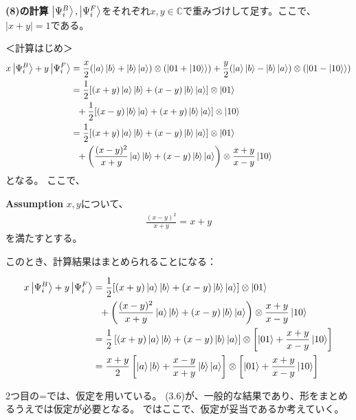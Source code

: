 \documentclass[a4paper,11pt]{jsarticle}
\numberwithin{equation}{section}
\begin{document}
\begin{itembox}[l]{\textbf{(8)の計算 }}
$\ket{\Psi_i^B},\ket{\Psi_i^F}$をそれぞれ$x,y \in \mathbb{C}$で重みづけして足す。ここで、$|x+y|=1$である。
\end{itembox}
＜計算はじめ＞
\begin{align}
x\ket{\Psi_i^B}+y\ket{\Psi_i^F} &= \frac{x}{2}(\ket{a}\ket{b}+\ket{b}\ket{a})\otimes (\ket{01+\ket{10}})+\frac{y}{2}(\ket{a}\ket{b}-\ket{b}\ket{a})\otimes (\ket{01-\ket{10}})\\
&=\frac{1}{2}[(x+y)\ket{a}\ket{b}+(x-y)\ket{b}\ket{a}]\otimes\ket{01} \notag\\
&\,\,\,\,  +\frac{1}{2}[(x-y)\ket{b}\ket{a}+(x+y)\ket{b}\ket{a}]\otimes\ket{10}\\
&=\frac{1}{2}[(x+y)\ket{a}\ket{b}+(x-y)\ket{b}\ket{a}]\otimes\ket{01} \notag\\
&\,\,\,\, +\left(\frac{(x-y)^2}{x+y}\ket{a}\ket{b}+(x-y)\ket{b}\ket{a}\right)\otimes\frac{x+y}{x-y}\ket{10} 
\end{align}
となる。
ここで、
\begin{itembox}[l]{\textbf{Assumption}}
  $x,y$について、
  \begin{align}
  \frac{(x-y)^2}{x+y}=x+y
  \end{align}
を満たすとする。
\end{itembox}
このとき、計算結果はまとめられることになる：

\begin{align}
  x\ket{\Psi_i^B}+y\ket{\Psi_i^F} &=
  \frac{1}{2}[(x+y)\ket{a}\ket{b}+(x-y)\ket{b}\ket{a}]\otimes\ket{01} \notag\\
  &\,\,\,\,+\left(\frac{(x-y)^2}{x+y}\ket{a}\ket{b}+(x-y)\ket{b}\ket{a}\right)\otimes\frac{x+y}{x-y}\ket{10} \\
  &=\frac{1}{2}\left[(x+y)\ket{a}\ket{b}+(x-y)\ket{b}\ket{a}\right]\otimes\left[\ket{01}+\frac{x+y}{x-y}\ket{10}\right]\\
  &=\frac{x+y}{2}\left[\ket{a}\ket{b}+\frac{x-y}{x+y}\ket{b}\ket{a}\right]\otimes\left[\ket{01}+\frac{x+y}{x-y}\ket{10}\right]
\end{align}

2つ目の=では、仮定を用いている。
(3.6)が、一般的な結果であり、形をまとめるうえでは仮定が必要となる。
ではここで、仮定が妥当であるか考えていく。\\
\end{document}
